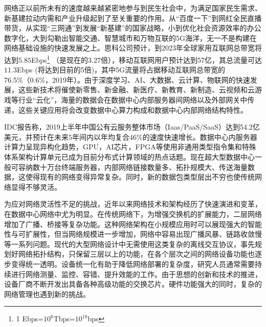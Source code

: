 
\label{chap1}


\label{chap11}
\label{chap111}


网络正以前所未有的速度越来越紧密地参与到民生社会中，为满足国家民生需求、新基建拉动内需和产业升级起到了至关重要的作用。从“百度一下”到网红全民直播带货，从实现“三网通”到发展“新基建”的国家战略，小到优化社会资源效率的办公数字化，大到勾勒出智能交通、智慧城市和万物互联的5G海洋，无一不是构建在网络基础设施的快速发展之上。思科公司预计，到2023年全球家用互联网总带宽将达到$5.85$Ebps\footnote{1 Ebps=$10^6$Tbps=$10^{18}$bps} （是现在的3.27倍），移动互联网用户预计达到57亿，其总流量可达$11.3$Ebps (将达到目前的5倍)，其中5G流量将占据移动互联网总带宽的76.5\%（0.6\%，2019年）。由于深度学习、AI、大数据、云计算、物联网的快速发展，这些新技术将催使新零售、新金融、新医疗、新教育、新制造、云视频和云游戏等行业“云化”，海量的数据会在数据中心内部服务器间网络以及外部网关中传递，这些关键应用将会改变数据中心算力构成和数据中心内部网络结构特性。

IDC报告称，2019上半年中国公有云服务整体市场（Iaas/PaaS/SaaS）达到54.2亿美元，并预计在未来5年间内以年均复合46\%的速度快速增长。数据中心内服务器计算力呈现异构化趋势，GPU，AI芯片，FPGA等使用非通用类型指令集和特殊体系架构计算单元已成为目前分布式计算领域的热点话题。现在超大型数据中心一般可容纳数十万台终端服务器，内部网络链接数量多、拓扑规模大、传送海量数据，这使得现有的网络变得异常复杂。同时，新的数据包类型层出不穷也使传统网络显得不够灵活。

为应对网络灵活性不足的挑战，近年以来网络技术和架构经历了快速演进和变革，在数据中心网络中尤为明显。在传统网络下，为增强交换机的扩展能力，二层网络增加了广播、桥接等复杂功能。这种网络架构在小规模应用时可以展现强大的智能性与可扩展性，但当网络规模进一步增加，网络中容易出现广播风暴、链路收敛慢等一系列问题。现代的大型网络设计中无需使用这类复杂的离线交互协议，事先规划好网络拓扑结构，只保留三层以上的功能，在各个层次之间的网络设备功能也逐步变得统一透明。设备统一化有助于降低网络部署的复杂度，研究人员通常需要持续进行网络测量、监控、容错、提升效能的工作。由于思想的创新和技术的推进，设备厂商不断开发出具备各种高级功能的交换芯片。硬件功能强大的同时，复杂的网络管理也遇到新的挑战。

